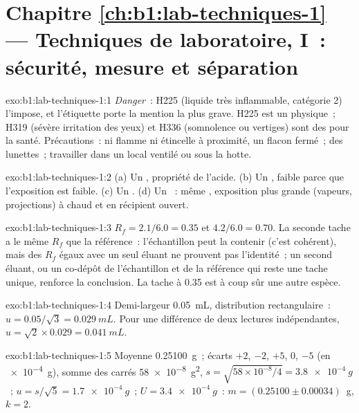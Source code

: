 \section*{Chapitre \ref{ch:b1:lab-techniques-1} --- Techniques de laboratoire, I~: sécurité, mesure et séparation}

\begin{solution}{exo:b1:lab-techniques-1:1}
\emph{Danger}~: H225 (liquide très inflammable, catégorie 2) l'impose, et
l'étiquette porte la mention la plus grave. H225 est un 
physique~; H319 (sévère irritation des yeux) et H336 (somnolence ou
vertiges) sont des  pour la santé. Précautions~: ni flamme ni
étincelle à proximité, un flacon fermé~; des lunettes~; travailler dans
un local ventilé ou sous la hotte.
\end{solution}

\begin{solution}{exo:b1:lab-techniques-1:2}
(a) Un , propriété de l'acide. (b) Un , faible parce que
l'exposition est faible. (c) Un . (d) Un ~: même ,
exposition plus grande (vapeurs, projections) à chaud et en récipient
ouvert.
\end{solution}

\begin{solution}{exo:b1:lab-techniques-1:3}
$R_f = 2.1/6.0 = 0.35$ et $4.2/6.0 = 0.70$. La seconde tache a le même
$R_f$ que la référence~: l'échantillon peut la contenir (c'est
cohérent), mais des $R_f$ égaux avec un seul éluant ne prouvent pas
l'identité~; un second éluant, ou un co-dépôt de l'échantillon et de la
référence qui reste une tache unique, renforce la conclusion. La tache à
0.35 est à coup sûr une autre espèce.
\end{solution}

\begin{solution}{exo:b1:lab-techniques-1:4}
Demi-largeur \qty{0.05}{mL}, distribution rectangulaire~: $u = 0.05/\sqrt3 = \qty{0.029}{mL}$.
Pour une différence de deux lectures indépendantes,
$u = \sqrt{2} \times 0.029 = \qty{0.041}{mL}$.
\end{solution}

\begin{solution}{exo:b1:lab-techniques-1:5}
Moyenne \qty{0.25100}{g}~; écarts $+2$, $-2$, $+5$, 0, $-5$ (en
\qty{e-4}{g}), somme des carrés \qty{58e-8}{g^2}, $s = \sqrt{58 \times
10^{-8}/4} = \qty{3.8e-4}{g}$~; $u = s/\sqrt5 = \qty{1.7e-4}{g}$~;
$U = \qty{3.4e-4}{g}$~: $m = (0.25100 \pm 0.00034)$~g, $k = 2$.
\end{solution}

